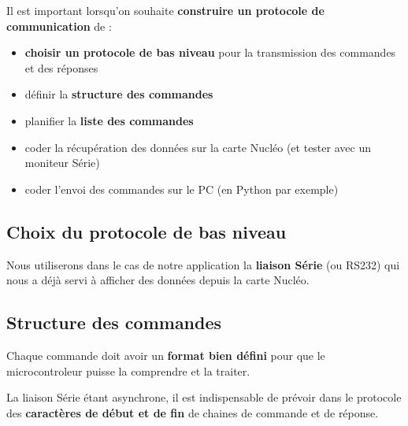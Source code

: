 \documentclass[a4paper,11pt,titlepage]{article} %
\begin{document}
\medskip

Il est important lorsqu'on souhaite \textbf{construire un protocole de communication} de :

\begin{itemize}
	\item \textbf{choisir un protocole de bas niveau} pour la transmission des commandes et des réponses
	\item définir la \textbf{structure des commandes}
	\item planifier la \textbf{liste des commandes}
	\item coder la récupération des données sur la carte Nucléo (et tester avec un moniteur Série)
	\item coder l'envoi des commandes sur le PC (en Python par exemple)
\end{itemize}


\subsection{Choix du protocole de bas niveau}

Nous utiliserons dans le cas de notre application la \textbf{liaison Série} (ou RS232) qui nous a déjà servi à afficher des données depuis la carte Nucléo.

\subsection{Structure des commandes}

Chaque commande doit avoir un \textbf{format bien défini} pour que le microcontroleur puisse la comprendre et la traiter.

\begin{center}
\end{center}

La liaison Série étant asynchrone, il est indispensable de prévoir dans le protocole des \textbf{caractères de début et de fin} de chaines de commande et de réponse.
\end{document}
